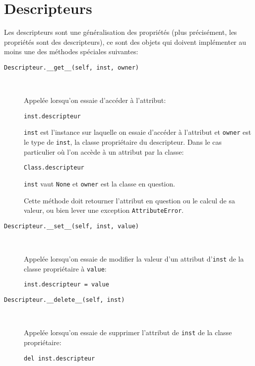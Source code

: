 \section{Descripteurs}\label{sec:descripteur}
Les descripteurs sont une généralisation des propriétés (plus précisément, les propriétés sont des descripteurs), ce sont
des objets qui doivent implémenter au moins une des méthodes spéciales suivantes:

\begin{description}
    \item[\texttt{Descripteur.__get__(self, inst, owner)}]~
    
    Appelée lorsqu'on essaie d'accéder à l'attribut:
    \begin{verbatim}
inst.descripteur
    \end{verbatim}
    \texttt{inst} est l'instance sur laquelle on essaie d'accéder à l'attribut et \texttt{owner}
    est le type de \texttt{inst}, la classe propriétaire du descripteur. Dans le cas particulier où l'on
    accède à un attribut par la classe:
    \begin{verbatim}
Class.descripteur
    \end{verbatim}
    \texttt{inst} vaut \texttt{None} et \texttt{owner} est la classe en question.\medskip

    Cette méthode doit retourner l'attribut en question ou le calcul de sa valeur, ou bien lever une exception \texttt{AttributeError}.

    \item[\texttt{Descripteur.__set__(self, inst, value)}]~
    
    Appelée lorsqu'on essaie de modifier la valeur d'un attribut d'\texttt{inst} de la classe propriétaire à
    \texttt{value}:
    \begin{verbatim}
inst.descripteur = value
    \end{verbatim}
    
    \item[\texttt{Descripteur.__delete__(self, inst)}]~
    
    Appelée lorsqu'on essaie de supprimer l'attribut de \texttt{inst} de la classe propriétaire:
    \begin{verbatim}
del inst.descripteur
    \end{verbatim}
\end{description}

